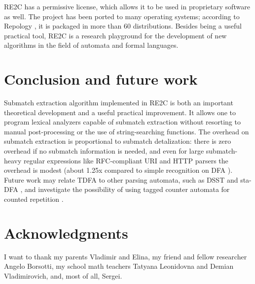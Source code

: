 \documentclass[preprint,12pt, a4paper]{elsarticle}
\begin{document}
\noindent
RE2C has a permissive license, which allows it to be used in proprietary software as well.
The project has been ported to many operating systems;
according to Repology \cite{Repology}, it is packaged in more than 60 distributions.
Besides being a useful practical tool, RE2C is a research playground for the development of new algorithms in the field of automata and formal languages.

\section{Conclusion and future work}

\noindent
Submatch extraction algorithm implemented in RE2C
is both an important theoretical development and a useful practical improvement.
It allows one to program lexical analyzers capable of submatch extraction
without resorting to manual post-processing or the use of string-searching functions.
The overhead on submatch extraction is proportional to submatch detalization:
there is zero overhead if no submatch information is needed,
and even for large submatch-heavy regular expressions like RFC-compliant URI and HTTP parsers the overhead is modest
(about 1.25x compared to simple recognition on DFA \cite{Tro17}).
%
Future work may relate TDFA to other parsing automata, such as DSST \cite{Gra15} and sta-DFA \cite{Cho18},
and investigate the possibility of using tagged counter automata for counted repetition \cite{Bec09}.


\section*{Acknowledgments}
\label{}
\noindent
I want to thank my parents Vladimir and Elina,
my friend and fellow researcher Angelo Borsotti,
my school math teachers Tatyana Leonidovna and Demian Vladimirovich,
and, most of all, Sergei.
\end{document}
